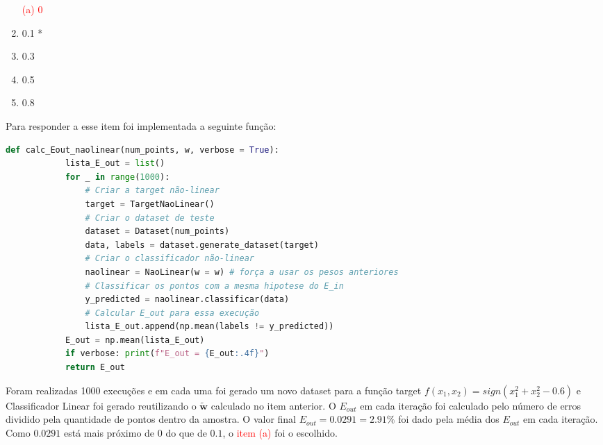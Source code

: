 \begin{enumerate}
    \begin{enumerate}
        \item [\textcolor{red}{(a)}]\textcolor{red}{0}\addtocounter{enumii}{1}
        \item 0.1 *
        \item 0.3
        \item 0.5
        \item 0.8
    \end{enumerate}

    Para responder a esse item foi implementada a seguinte função:

    \begin{lstlisting}[language=Python, caption=Cálculo do E\_out para a Regressão Não-Linear, label=cod:calc_E_out_naolinear]
        def calc_Eout_naolinear(num_points, w, verbose = True):
            lista_E_out = list()
            for _ in range(1000):
                # Criar a target não-linear
                target = TargetNaoLinear()
                # Criar o dataset de teste
                dataset = Dataset(num_points)
                data, labels = dataset.generate_dataset(target)
                # Criar o classificador não-linear
                naolinear = NaoLinear(w = w) # força a usar os pesos anteriores
                # Classificar os pontos com a mesma hipotese do E_in
                y_predicted = naolinear.classificar(data)
                # Calcular E_out para essa execução
                lista_E_out.append(np.mean(labels != y_predicted))
            E_out = np.mean(lista_E_out)
            if verbose: print(f"E_out = {E_out:.4f}")
            return E_out
    \end{lstlisting}

    Foram realizadas 1000 execuções e em cada uma foi gerado um novo dataset para a função target $f(x_1,x_2) = sign(x_1^2 + x_2^2 - 0.6) $ e Classificador Linear foi gerado reutilizando o $\tilde{\boldsymbol{w}}$ calculado no item anterior. O $E_{out}$ em cada iteração foi calculado pelo número de erros dividido pela quantidade de pontos dentro da amostra. O valor final $E_{out} = 0.0291 = 2.91\%$ foi dado pela média dos $E_{out}$ em cada iteração. Como $0.0291$ está mais próximo de $0$ do que de $0.1$, o \textcolor{red}{item (a)} foi o escolhido.

\end{enumerate}


